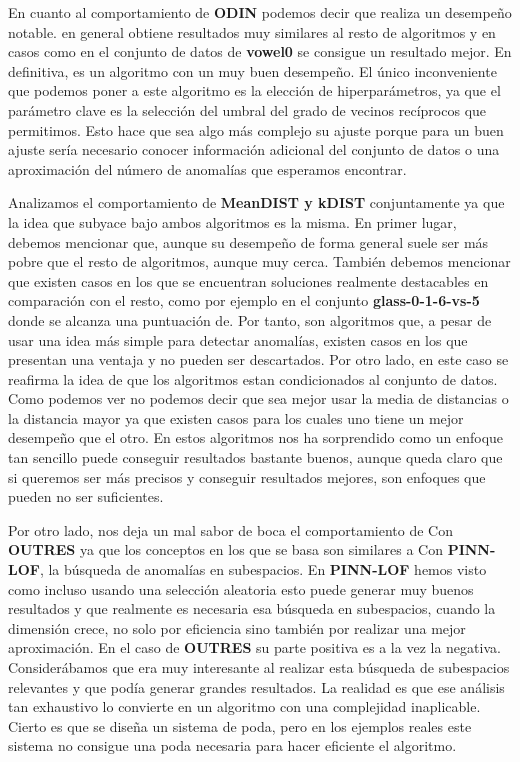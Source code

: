 En cuanto al comportamiento de \textbf{ODIN} podemos decir que realiza un desempeño notable. en general 
obtiene resultados muy similares al resto de algoritmos y en casos como en el conjunto de datos de  
\textbf{vowel0} se consigue un resultado mejor. En definitiva, es un algoritmo con un muy buen 
desempeño. El único inconveniente que podemos poner a este algoritmo es la elección 
de hiperparámetros, ya que el parámetro clave es la selección del umbral del grado de vecinos 
recíprocos que permitimos. Esto hace que sea algo más complejo su ajuste porque para un buen ajuste sería necesario 
conocer información adicional del conjunto de datos o una aproximación del número de anomalías que esperamos 
encontrar. 

Analizamos el comportamiento de \textbf{MeanDIST y kDIST} conjuntamente ya que la idea que subyace bajo 
ambos algoritmos es la misma. En primer lugar, debemos mencionar que, aunque su desempeño de forma general 
suele ser más pobre que el resto de algoritmos, aunque muy cerca. También debemos mencionar que existen casos 
en los que se encuentran soluciones realmente destacables en comparación con el resto, como por ejemplo en  
el conjunto \textbf{glass-0-1-6-vs-5} donde se alcanza una puntuación de. Por tanto, son algoritmos 
que, a pesar de usar una idea más simple para detectar anomalías, existen casos en los que presentan una ventaja 
y no pueden ser descartados. Por otro lado, en este caso se reafirma la idea de que los algoritmos estan condicionados 
al conjunto de datos. Como podemos ver no podemos decir que sea mejor usar la media de distancias o la distancia mayor 
ya que existen casos para los cuales uno tiene un mejor desempeño que el otro. En estos algoritmos nos ha sorprendido 
como un enfoque tan sencillo puede conseguir resultados bastante buenos, aunque queda claro que si queremos 
ser más precisos y conseguir resultados mejores, son enfoques que pueden no ser suficientes. 

Por otro lado, nos deja un mal sabor de boca el comportamiento de Con \textbf{OUTRES} 
ya que los conceptos en los que se basa son similares a Con \textbf{PINN-LOF}, 
la búsqueda de anomalías en subespacios. En \textbf{PINN-LOF} hemos visto como incluso usando 
una selección aleatoria esto puede generar muy buenos resultados y que realmente es necesaria esa  
búsqueda en subespacios, cuando la dimensión crece, no solo por eficiencia sino también por realizar 
una mejor aproximación. En el caso de \textbf{OUTRES} su parte positiva es a la vez la negativa. Considerábamos 
que era muy interesante al realizar esta búsqueda de subespacios relevantes y que podía generar grandes resultados. 
La realidad es que ese análisis tan exhaustivo lo convierte en un algoritmo con una complejidad inaplicable. 
Cierto es que se diseña un sistema de poda, pero en los ejemplos reales este sistema no consigue una poda necesaria 
para hacer eficiente el algoritmo. 


